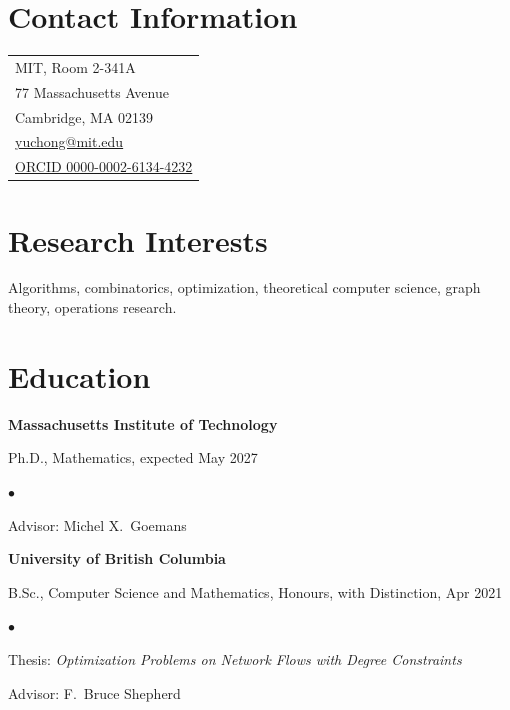 \documentclass[margin,line]{res}
\newenvironment{list1}{
  \begin{list}{\ding{113}}{%
      \setlength{\itemsep}{0in}
      \setlength{\parsep}{0.025in} \setlength{\parskip}{0in}
      \setlength{\topsep}{0in} \setlength{\partopsep}{0in}
      \setlength{\leftmargin}{0.17in}}}{\end{list}}
\newenvironment{list2}{
  \begin{list}{$\bullet$}{%
      \setlength{\itemsep}{0in}
      \setlength{\parsep}{0in} \setlength{\parskip}{0in}
      \setlength{\topsep}{0in} \setlength{\partopsep}{0in}
      \setlength{\leftmargin}{0.2in}}}{\end{list}}
\begin{document}

\begin{resume}

\section{\sc Contact Information}

\vspace{.05in}
\begin{tabular}{p{2in}}
MIT, Room 2-341A \\
77 Massachusetts Avenue \\
Cambridge, MA 02139 \\
\href{mailto:yuchong@mit.edu}{yuchong@mit.edu} \\
\href{https://orcid.org/0000-0002-6134-4232}{ORCID 0000-0002-6134-4232}
\end{tabular}


\section{\sc Research Interests}
Algorithms, combinatorics, optimization, theoretical computer science, graph theory, operations research.

\section{\sc Education}

{\bf Massachusetts Institute of Technology} \\
\vspace*{-.1in}
\begin{list1}
\item[] Ph.D., Mathematics, expected May 2027
  \begin{list2}
    \item[$\circ$] Advisor: Michel X.\ Goemans
  \end{list2}
\end{list1}

{\bf University of British Columbia}\\
\vspace*{-.1in}
\begin{list1}
\item[] B.Sc., Computer Science and Mathematics, Honours, with Distinction, Apr 2021
  \begin{list2}
  \item[$\circ$] Thesis: \emph{Optimization Problems on Network Flows with Degree Constraints} %
  \item[$\circ$] Advisor: F.\ Bruce Shepherd
  \end{list2}
\end{list1}



\end{resume}
\end{document}
